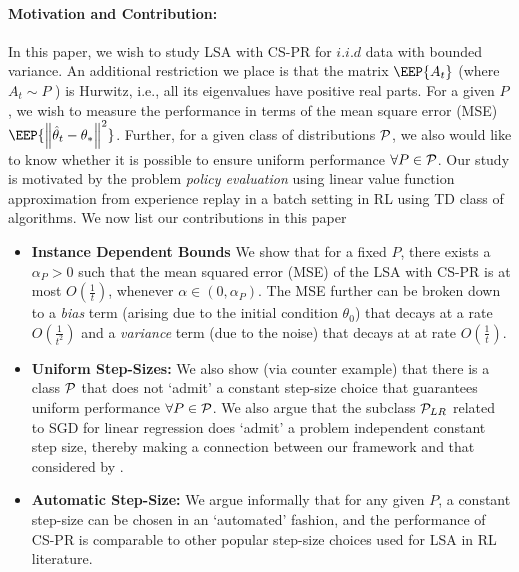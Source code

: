 \paragraph{Motivation and Contribution:} In this paper, we wish to study LSA with CS-PR for $i.i.d$ data with bounded variance. An additional restriction we place is that the matrix $\EEP{A_t}$ (where $A_t\sim P$ ) is Hurwitz, i.e., all its eigenvalues have positive real parts. For a given $P$, we wish to measure the performance in terms of the mean square error (MSE) $\EEP{\norm{\thh_t-\ts}^2}$. Further, for a given class of distributions $\P$, we also would like to know whether it is possible to ensure uniform performance $\forall P\in \P$.
Our study is motivated by the problem \emph{policy evaluation} \cite{dann} using linear value function approximation from experience replay \cite{lin} in a batch setting \cite{lange} in RL using TD class \cite{sutton,konda-tsitsiklis,gtd,gtd2,gtdmp} of algorithms. We now list our contributions in this paper
\begin{itemize}[leftmargin=*]%
\item \textbf{Instance Dependent Bounds} We show that for a fixed $P$, there exists a $\alpha_P>0$ such that the mean squared error (MSE) of the LSA with CS-PR is at most $O(\frac{1}{t})$, whenever $\alpha\in (0,\alpha_P)$. The MSE further can be broken down to a \emph{bias} term (arising due to the initial condition $\theta_0$) that decays at a rate $O(\frac{1}{t^2})$ and a \emph{variance} term (due to the noise) that decays at at rate $O(\frac{1}{t})$.
\item \textbf{Uniform Step-Sizes:} We also show (via counter example) that there is a class $\P$ that does not `admit' a constant step-size choice that guarantees uniform performance $\forall P\in \P$. We also argue that the subclass $\P_{LR}$ related to SGD for linear regression does `admit' a problem independent constant step size, thereby making a connection between our framework and that considered by \cite{bach}.
\item \textbf{Automatic Step-Size:} We argue informally that for any given $P$, a constant step-size can be chosen in an `automated' fashion, and the performance of CS-PR is comparable to other popular step-size choices used for LSA in RL literature.
\end{itemize}
